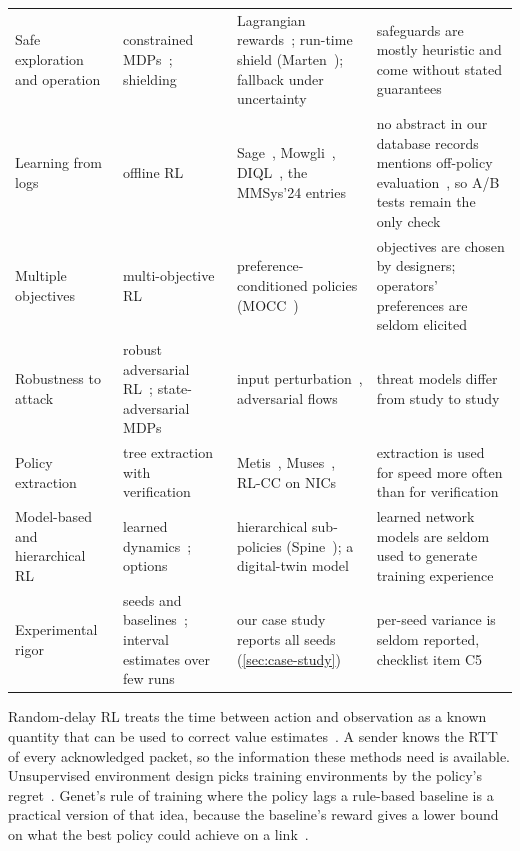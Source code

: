 \begin{table}[t]
\begin{tabularx}{\linewidth}{@{}L{2.2cm}L{3.5cm}L{4.0cm}Y@{}}
Safe exploration and operation & constrained MDPs~\cite{altman1999constrained,achiam2017constrained}; shielding~\cite{alshiekh2018safe} & Lagrangian rewards~\cite{liu2021multi,hou2023deep}; run-time shield (Marten~\cite{zhou2025safety}); fallback under uncertainty~\cite{jia2026han,kai2025robust} & safeguards are mostly heuristic and come without stated guarantees \\
Learning from logs & offline RL~\cite{levine2020offline,fujimoto2019off,kumar2020cql,kostrikov2022offline} & Sage~\cite{yen2023sage}, Mowgli~\cite{agarwal2025mowgli}, DIQL~\cite{khairy2026human}, the MMSys'24 entries~\cite{tan2024accurate,cetinkaya2024offline} & no abstract in our database records mentions off-policy evaluation~\cite{fu2021benchmarks}, so A/B tests remain the only check \\
Multiple objectives & multi-objective RL~\cite{hayes2022practical,abels2019dynamic} & preference-conditioned policies (MOCC~\cite{ma2022mocc}) & objectives are chosen by designers; operators' preferences are seldom elicited \\
Robustness to attack & robust adversarial RL~\cite{pinto2017robust}; state-adversarial MDPs~\cite{zhang2020robust} & input perturbation~\cite{yang2022good}, adversarial flows~\cite{chen2025exploring} & threat models differ from study to study \\
Policy extraction & tree extraction with verification~\cite{bastani2018verifiable} & Metis~\cite{meng2020interpreting}, Muses~\cite{zhong2022muses}, RL-CC on NICs~\cite{fuhrer2023nvidia} & extraction is used for speed more often than for verification \\
Model-based and hierarchical RL & learned dynamics~\cite{janner2019when}; options~\cite{sutton1999between} & hierarchical sub-policies (Spine~\cite{tian2024spine}); a digital-twin model~\cite{kattepur2024integrate} & learned network models are seldom used to generate training experience \\
Experimental rigor & seeds and baselines~\cite{henderson2018deep}; interval estimates over few runs~\cite{agarwal2021deep} & our case study reports all seeds (\cref{sec:case-study}) & per-seed variance is seldom reported, checklist item C5 \\
\bottomrule
\end{tabularx}
\end{table}

Random-delay RL treats the time between action and observation as a known quantity that can be used to correct value estimates~\cite{ramstedt2021reinforcement}. A sender knows the RTT of every acknowledged packet, so the information these methods need is available. Unsupervised environment design picks training environments by the policy's regret~\cite{dennis2020emergent}. Genet's rule of training where the policy lags a rule-based baseline is a practical version of that idea, because the baseline's reward gives a lower bound on what the best policy could achieve on a link~\cite{xia2022genet}.




